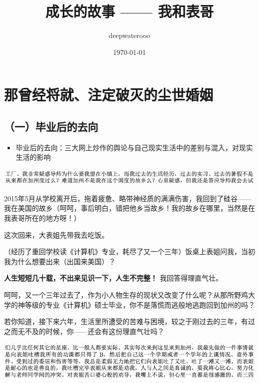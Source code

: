 \documentclass[9pt, b5paper]{article}
\author{deepwaterooo}
\date{\today}
\title{成长的故事 —— 我和表哥}
\begin{document}
\maketitle
\tableofcontents



\section{那曾经将就、注定破灭的尘世婚姻}
\label{sec:org5253827}

\subsection{（一）毕业后的去向}
\label{sec:org9e4d273}

\begin{itemize}
\item 毕业后的去向：三大网上炒作的舆论与自己现实生活中的差别与混入，对现实生活的影响
\end{itemize}

\begin{center}
\includegraphics[width=.9\linewidth]{./pic/backups_plans_20210426_095826.png}
\end{center}

2015年5月从学校离开后，拖着疲惫、略带神经质的满满伤害，我回到了硅谷——我在美国的故乡（呵呵，事后明白，错把他乡当故乡！我的故乡在哪里，当然是在我表哥所在的地方呀！）

这次回来，大表姐先带我去吃饭。

（经历了重回学校读《计算机》专业，耗尽了又一个三年）饭桌上表姐问我，当初我为什么想要出来（出国来美国）？

\textbf{人生短短几十载，不出来见识一下，人生不完整！} 我回答得理直气壮。

呵呵，又一个三年过去了，作为小人物生存的现状又改变了什么呢？从那所野鸡大学的神等级的专业《计算机》硕士毕业，你不是落慌而逃般地逃跑回到加州的吗？

若你知道，接下来六年，生活里所遭受的苦难与困境，较之于刚过去的三年，有过之而无不及的时候，你——还会有这份理直气壮吗？

\begin{center}
\includegraphics[width=.9\linewidth]{./pic/backups_plans_20210426_094357.png}
\end{center}
\end{document}
